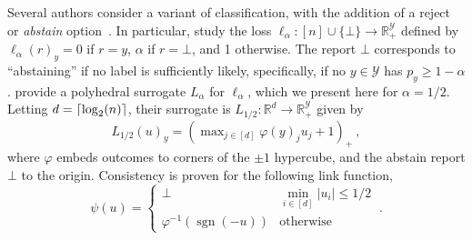 \documentclass[11pt]{article}
\newcommand{\Comments}{1}
\newcommand{\mynote}[2]{\ifnum\Comments=1\textcolor{#1}{#2}\fi}
\newcommand{\raf}[1]{\mynote{darkgreen}{[RF: #1]}}
\newcommand{\jessie}[1]{\mynote{teal}{[JF: #1]}}
\newcommand{\reals}{\mathbb{R}}
\newcommand{\Y}{\mathcal{Y}}
\DeclarePairedDelimiter\ceil{\lceil}{\rceil}
\newcommand{\ellabs}[1]{\ell_{#1}}
\DeclareMathOperator*{\sgn}{sgn}
\begin{document}

Several authors consider a variant of classification, with the addition of a reject or \emph{abstain} option~\citep{bartlett2008classification,ramaswamy2018consistent,madras2018predict,elyaniv2010foundations,cortes2016learning}.
In particular, \citet{ramaswamy2018consistent} study the loss $\ellabs{\alpha} : [n] \cup \{\bot\} \to \reals^\Y_+$ defined by $\ellabs{\alpha}(r)_y = 0$ if $r=y$, $\alpha$ if $r = \bot$, and 1 otherwise.
The report $\bot$ corresponds to ``abstaining'' if no label is sufficiently likely, specifically, if no $y\in\Y$ has $p_y \geq 1-\alpha$.
\citeauthor{ramaswamy2018consistent} provide a polyhedral surrogate $L_\alpha$ for $\ellabs{\alpha}$, which we present here for $\alpha=1/2$.
Letting $d = \ceil{\log_2(n)}$, their surrogate is $L_{1/2} : \reals^d \to \reals^\Y_+$ given by
\begin{equation}\label{eq:abstain-surrogate}
L_{1/2}(u)_y = \left(\max\nolimits_{j \in [d]}\varphi(y)_j u_j + 1\right)_+~,
\end{equation}
where $\varphi$ embeds outcomes to corners of the $\pm 1$ hypercube, and the abstain report $\bot$ to the origin.
Consistency is proven for the following link function,
\begin{equation}\label{eq:abstain-link}
  \psi(u) = \begin{cases}
	\bot & \min_{i \in [d]} |u_i| \leq 1/2\\
	\varphi^{-1}(\sgn(-u)) &\text{otherwise}
  \end{cases}~.
\end{equation}
\end{document}
